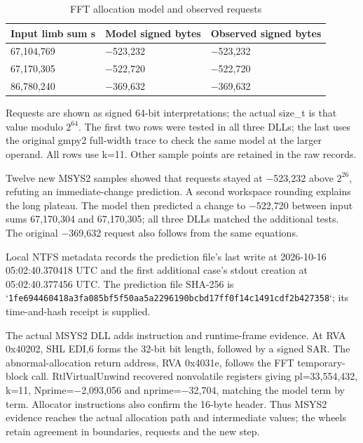 \documentclass[11pt,a4paper]{article}
\begin{document}
\begin{table}[htbp]
\centering\small
\caption{FFT allocation model and observed requests}
\begin{tabularx}{\linewidth}{lXX}
\toprule
Input limb sum s & Model signed bytes & Observed signed bytes \\
\midrule
67,104,769 & \ensuremath{-}523,232 & \ensuremath{-}523,232 \\
67,170,305 & \ensuremath{-}522,720 & \ensuremath{-}522,720 \\
86,780,240 & \ensuremath{-}369,632 & \ensuremath{-}369,632 \\
\bottomrule
\end{tabularx}
\end{table}

Requests are shown as signed 64-bit interpretations; the actual size\_\allowbreak{}t is that value modulo $2^{64}$. The first two rows were tested in all three DLLs; the last uses the original gmpy2 full-width trace to check the same model at the larger operand. All rows use k=11. Other sample points are retained in the raw records.

Twelve new MSYS2 samples showed that requests stayed at \ensuremath{-}523,232 above $2^{26}$, refuting an immediate-change prediction. A second workspace rounding explains the long plateau. The model then predicted a change to \ensuremath{-}522,720 between input sums 67,170,304 and 67,170,305; all three DLLs matched the additional tests. The original \ensuremath{-}369,632 request also follows from the same equations.

Local NTFS metadata records the prediction file's last write at 2026-10-16 05:02:40.370418 UTC and the first additional case's stdout creation at 05:02:40.377456 UTC. The prediction file SHA-256 is `\texttt{1fe694460418a3fa\allowbreak{}085bf5f50aa5a229\allowbreak{}6190bcbd17ff0f14\allowbreak{}c1491cdf2b427358}`; its time-and-hash receipt is supplied.

The actual MSYS2 DLL adds instruction and runtime-frame evidence. At RVA 0x40202, SHL EDI,6 forms the 32-bit bit length, followed by a signed SAR. The abnormal-allocation return address, RVA 0x4031e, follows the FFT temporary-block call. RtlVirtualUnwind recovered nonvolatile registers giving pl=33,554,432, k=11, Nprime=\ensuremath{-}2,093,056 and nprime=\ensuremath{-}32,704, matching the model term by term. Allocator instructions also confirm the 16-byte header. Thus MSYS2 evidence reaches the actual allocation path and intermediate values; the wheels retain agreement in boundaries, requests and the new step.
\end{document}
